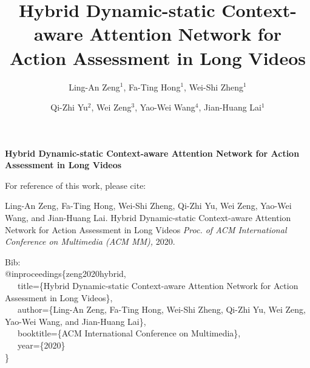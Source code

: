 \documentclass[sigconf]{acmart}
\begin{document}
{\onecolumn
\noindent \vspace{1cm}

\noindent \textbf{\huge{Hybrid Dynamic-static Context-aware Attention Network for Action Assessment in Long Videos}}

\vspace{2cm}


\vspace{2cm}





\noindent For reference of this work, please cite:

\vspace{1cm}
\noindent Ling-An Zeng, Fa-Ting Hong, Wei-Shi Zheng, Qi-Zhi Yu, Wei Zeng, Yao-Wei Wang, and Jian-Huang Lai.
Hybrid Dynamic-static Context-aware Attention Network for Action Assessment in Long Videos \emph{Proc. of ACM International Conference on Multimedia (ACM MM),} 2020.  

\vspace{1cm}
\noindent Bib:\\
\noindent
@inproceedings\{zeng2020hybrid,\\
\ \ \   title=\{Hybrid Dynamic-static Context-aware Attention Network for Action Assessment in Long Videos\},\\
\ \ \  author=\{Ling-An Zeng, Fa-Ting Hong, Wei-Shi Zheng, Qi-Zhi Yu, Wei Zeng, Yao-Wei Wang, and Jian-Huang Lai\},\\
\ \ \  booktitle=\{ACM International Conference on Multimedia\},\\
\ \ \  year=\{2020\}\\
\}
}

\title{Hybrid Dynamic-static Context-aware Attention Network for Action Assessment in Long Videos}



\author{Ling-An Zeng$^1$, Fa-Ting Hong$^1$, Wei-Shi Zheng$^{1}$  }

\author{Qi-Zhi Yu$^2$, Wei Zeng$^3$, Yao-Wei Wang$^4$, Jian-Huang Lai$^1$}
        
 
\end{document}
